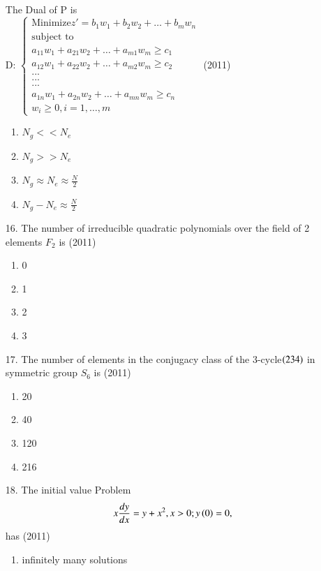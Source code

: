 \documentclass[journal]{IEEEtran}
\begin{document}
\begin{enumerate}
    \\The Dual of P is\\
    D: $\begin{cases} \text{Minimize} z' = b_1w_1+b_2w_2+\ldots+b_mw_n\\\text{subject to}\\a_{11}w_1+a_{21}w_2+\ldots+a_{m1}w_m \geq c_1\\a_{12}w_1+a_{22}w_2+\ldots+a_{m2}w_m \geq c_2\\.      .      .\\.      .      .\\.      .      .\\a_{1n}w_1+a_{2n}w_2+\ldots+a_{mn}w_m \geq c_n\\ w_i \geq 0, i=1,\ldots,m\end{cases}$
    \hfill (2011)
    \begin{enumerate}[label=(\Alph*)]
        \item $N_g<<N_e$
        \item $N_g>>N_e$
        \item $N_g\approx N_e\approx \frac{N}{2}$
        \item $N_g-N_e\approx \frac{N}{2}$
    \end{enumerate}
    \item[16.] The number of irreducible quadratic polynomials over the field of 2 elements $F_2$ is  \hfill (2011)
    \begin{enumerate}[label=(\Alph*)]
        \item 0
        \item 1
        \item 2
        \item 3
    \end{enumerate}
    \item[17.] The number of elements in the conjugacy class of the 3-cycle$\left(2 3 4\right)$ in symmetric group $S_6$ is  \hfill (2011)
    \begin{enumerate}[label=(\Alph*)]
        \item 20
        \item 40 
        \item 120
        \item 216
    \end{enumerate}
    \item[18.] The initial value Problem
    $$x\frac{dy}{dx} = y + x^2, x>0; y\left(0\right) = 0,$$ has  \hfill (2011)
    \begin{enumerate}[label=(\Alph*)]
        \item infinitely many solutions

\end{enumerate}
\end{enumerate}
\end{document}
